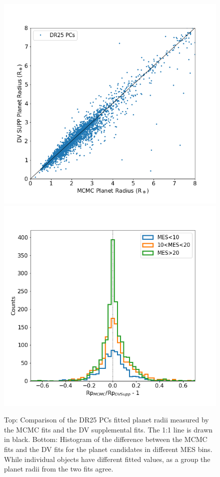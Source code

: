 \begin{figure}[ht]
\centering
\includegraphics[width=0.99\linewidth]{fig-comparePradius-mcmcSup.png}
\includegraphics[width=0.99\linewidth]{fig-comparePradius-histogram.png}
\caption{Top: Comparison of the DR25 PCs fitted planet radii measured by the MCMC fits and the DV supplemental fits. The 1:1 line is drawn in black. Bottom: Histogram of the difference between the MCMC fits and the DV fits for the planet candidates in different MES bins. While individual objects have different fitted values, as a group the planet radii from the two fits agree. }
\label{f:mcmcsupp}
\end{figure}


